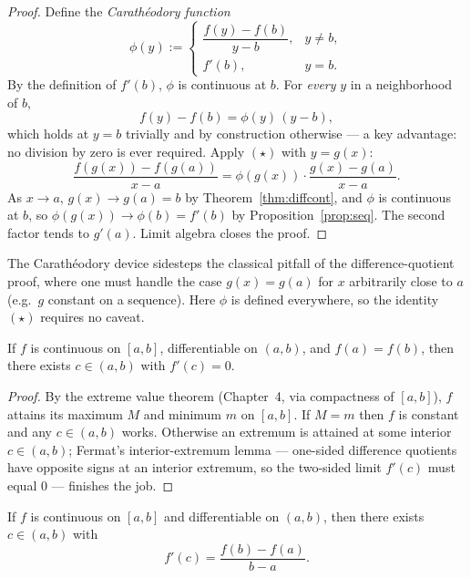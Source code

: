 \begin{proof}
Define the \emph{Carath\'eodory function}
\[
\phi(y):=
\begin{cases}
\dfrac{f(y)-f(b)}{y-b}, & y\ne b,\\[2pt]
f'(b), & y=b.
\end{cases}
\]
By the definition of $f'(b)$, $\phi$ is continuous at $b$. For \emph{every} $y$ in a neighborhood of $b$,
\[
f(y)-f(b)=\phi(y)\,(y-b),\tag{$\star$}
\]
which holds at $y=b$ trivially and by construction otherwise --- a key advantage: no division by zero is ever required. Apply $(\star)$ with $y=g(x)$:
\[
\frac{f(g(x))-f(g(a))}{x-a}=\phi(g(x))\cdot\frac{g(x)-g(a)}{x-a}.
\]
As $x\to a$, $g(x)\to g(a)=b$ by Theorem~\ref{thm:diffcont}, and $\phi$ is continuous at $b$, so $\phi(g(x))\to\phi(b)=f'(b)$ by Proposition~\ref{prop:seq}. The second factor tends to $g'(a)$. Limit algebra closes the proof.
\end{proof}

\begin{remark}
The Carath\'eodory device sidesteps the classical pitfall of the difference-quotient proof, where one must handle the case $g(x)=g(a)$ for $x$ arbitrarily close to $a$ (e.g.\ $g$ constant on a sequence). Here $\phi$ is defined everywhere, so the identity $(\star)$ requires no caveat.
\end{remark}

\begin{lemma}[Rolle]\label{lem:rolle}
If $f$ is continuous on $[a,b]$, differentiable on $(a,b)$, and $f(a)=f(b)$, then there exists $c\in(a,b)$ with $f'(c)=0$.
\end{lemma}

\begin{proof}
By the extreme value theorem (Chapter~4, via compactness of $[a,b]$), $f$ attains its maximum $M$ and minimum $m$ on $[a,b]$. If $M=m$ then $f$ is constant and any $c\in(a,b)$ works. Otherwise an extremum is attained at some interior $c\in(a,b)$; Fermat's interior-extremum lemma --- one-sided difference quotients have opposite signs at an interior extremum, so the two-sided limit $f'(c)$ must equal $0$ --- finishes the job.
\end{proof}

\begin{theorem}\label{thm:mvt}
If $f$ is continuous on $[a,b]$ and differentiable on $(a,b)$, then there exists $c\in(a,b)$ with
\[
f'(c)=\frac{f(b)-f(a)}{b-a}.
\]
\end{theorem}

